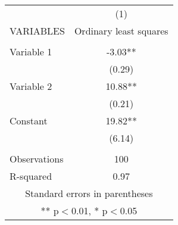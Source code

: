 \begin{tabular}{lc} \hline
 & (1) \\
VARIABLES & Ordinary least squares \\ \hline
 &  \\
Variable 1 & -3.03** \\
 & (0.29) \\
Variable 2 & 10.88** \\
 & (0.21) \\
Constant & 19.82** \\
 & (6.14) \\
 &  \\
Observations & 100 \\
 R-squared & 0.97 \\ \hline
\multicolumn{2}{c}{ Standard errors in parentheses} \\
\multicolumn{2}{c}{ ** p$<$0.01, * p$<$0.05} \\
\end{tabular}
